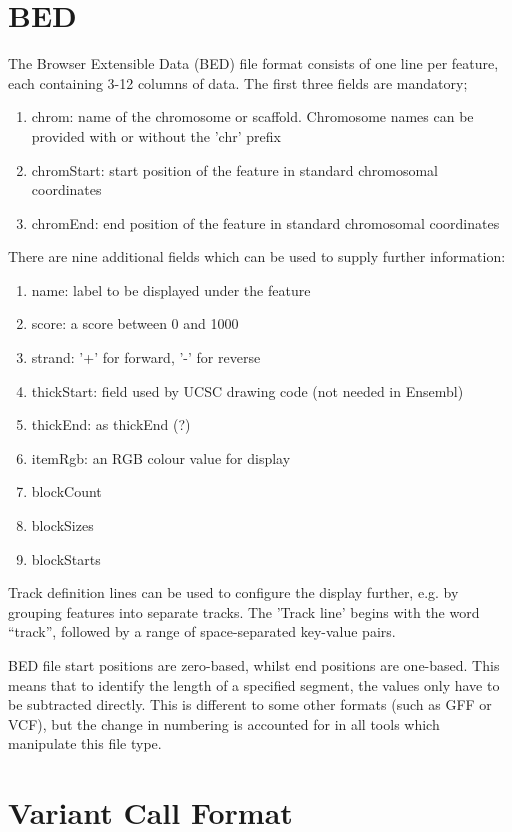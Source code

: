 \documentclass[12pt]{report}
\begin{document}
\section*{BED}

The Browser Extensible Data (BED) file format consists of one line per feature, each containing 3-12 columns of data. The first three fields are mandatory;
\begin{enumerate}
	\item chrom: name of the chromosome or scaffold. Chromosome names can be provided with or without the 'chr' prefix
	\item chromStart: start position of the feature in standard chromosomal coordinates
	\item chromEnd: end position of the feature in standard chromosomal coordinates
\end{enumerate}
There are nine additional fields which can be used to supply further information:
\begin{enumerate}[resume]
	\item name: label to be displayed under the feature
	\item score: a score between 0 and 1000
	\item strand: '+' for forward, '-' for reverse
	\item thickStart: field used by UCSC drawing code (not needed in Ensembl)
	\item thickEnd: as thickEnd (?)
	\item itemRgb: an RGB colour value for display
	\item blockCount
	\item blockSizes
	\item blockStarts
\end{enumerate}
Track definition lines can be used to configure the display further, e.g. by grouping features into separate tracks. The 'Track line' begins with the word ``track'', followed by a range of space-separated key-value pairs.

BED file start positions are zero-based, whilst end positions are one-based. This means that to identify the length of a specified segment, the values only have to be subtracted directly. This is different to some other formats (such as GFF or VCF), but the change in numbering is accounted for in all tools which manipulate this file type.

\section*{Variant Call Format}
\end{document}
